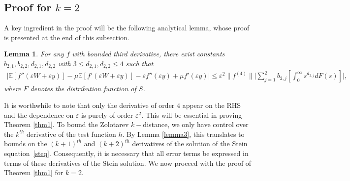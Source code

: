 \documentclass[11pt,letterpaper,reqno]{article}
\theoremstyle{thmstyleone}%
\theoremstyle{thmstyletwo}%
\newtheorem{lemma}{Lemma}
\theoremstyle{thmstylethree}%
\numberwithin{equation}{section}
\begin{document}
\subsection{Proof for $k=2$ }\label{sec k=2}
A key ingredient in the proof will be the following analytical lemma, whose proof is presented at the end of this subsection.
\begin{lemma}\label{Lemma k=2}
 For any $f$ with bounded third derivative, there exist constants $b_{2,1},b_{2,2},d_{2,1},d_{2,2}$ with  $3 \leq d_{2,1},d_{2,2} \leq 4$ such that 
    \begin{align*}
        \bigg|\mathbb E[f''(\varepsilon W+\varepsilon y)]-\mu \mathbb E[f'(\varepsilon W+\varepsilon y)]-\varepsilon f''(\varepsilon y)
     +\mu f'(\varepsilon y)\bigg|\leq \varepsilon^2 \|f^{(4)}\| \bigg|\sum_{j=1}^{2}b_{2,j}  \left[ \int_0^\infty s^{d_{2,j}}dF(s)\right]\bigg|,
    \end{align*}
where $F$ denotes the distribution function of $S$.
\end{lemma}
It is worthwhile to note that only the derivative of order $4$ appear on the RHS and the dependence on $\varepsilon$ is purely of order $\varepsilon^2$. This will be essential in proving Theorem \ref{thm1}. To bound the Zolotarev $k-$distance, we only have control over the $k^{th}$ derivative of the test function $h$. By Lemma \ref{lemma3}, this translates to bounds on the $(k+1)^{th}$ and $(k+2)^{th}$ derivatives of the solution of the Stein equation~\eqref{steq}. Consequently, it is necessary that all error terms be expressed in terms of these derivatives of the Stein solution. We now proceed with the proof of Theorem \ref{thm1} for $k=2$.
\end{document}
